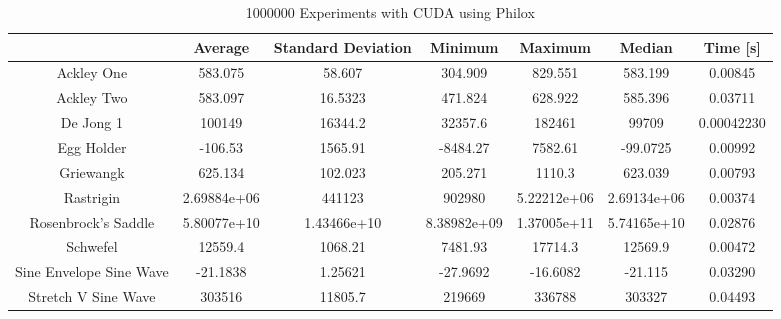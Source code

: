\documentclass{article}
\begin{document}
	\begin{table}[h]
        \begin{centering}
            \begin{tabular}{|c||c|c|c|c|c|c|}
                \hline
                            & Average & Standard Deviation & Minimum & Maximum & Median & Time [s] \\
                \hline
                \hline
                Ackley One & 583.075 & 58.607 & 304.909 & 829.551 & 583.199 & 0.00845 \\
                \hline
                Ackley Two & 583.097 & 16.5323 & 471.824 & 628.922 & 585.396 & 0.03711 \\
                \hline
                De Jong 1 & 100149 & 16344.2 & 32357.6 & 182461 & 99709 & 0.00042230\\
                \hline
                Egg Holder & -106.53 & 1565.91 & -8484.27 & 7582.61 & -99.0725 & 0.00992 \\
                \hline
                Griewangk & 625.134 & 102.023 & 205.271 & 1110.3 & 623.039 & 0.00793 \\
                \hline
                Rastrigin & 2.69884e+06 & 441123 & 902980 & 5.22212e+06 & 2.69134e+06 & 0.00374 \\
                \hline
                Rosenbrock's Saddle & 5.80077e+10 & 1.43466e+10 & 8.38982e+09 & 1.37005e+11 & 5.74165e+10 & 0.02876 \\
                \hline
                Schwefel & 12559.4 & 1068.21 & 7481.93 & 17714.3 & 12569.9 & 0.00472 \\
                \hline
                Sine Envelope Sine Wave & -21.1838 & 1.25621 & -27.9692 & -16.6082 & -21.115 & 0.03290\\
                \hline
                Stretch V Sine Wave & 303516 & 11805.7 & 219669 & 336788 & 303327 & 0.04493\\
                \hline
            \end{tabular}
            \caption{1000000 Experiments with CUDA using Philox}
        \end{centering}
        \end{table}
\end{document}
